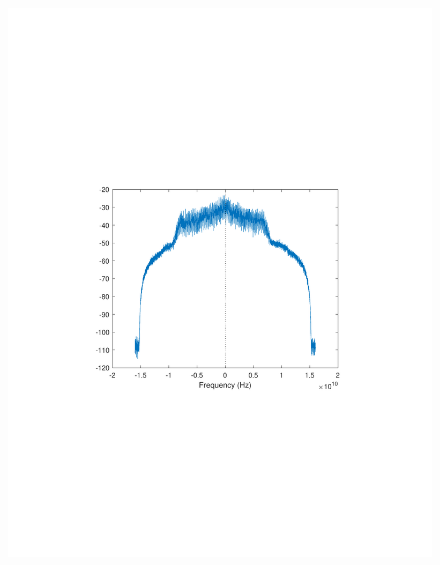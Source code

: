\begin{refsection}
\begin{figure}[H]
	\centering
	\begin{minipage}{0.30\textwidth}
		\centering
		\includegraphics[clip, trim=4cm 8cm 4cm 8cm, width=1\textwidth]{./sdf/m_qam_system/figures/expResults/intradyne/2_16GBdInSig13dB_AfMF.pdf}
		\label{fig:16GBdEyeMf}
	\end{minipage}
	\begin{minipage}{0.30\textwidth}
		\centering

\end{minipage}
\end{figure}
\end{refsection}
